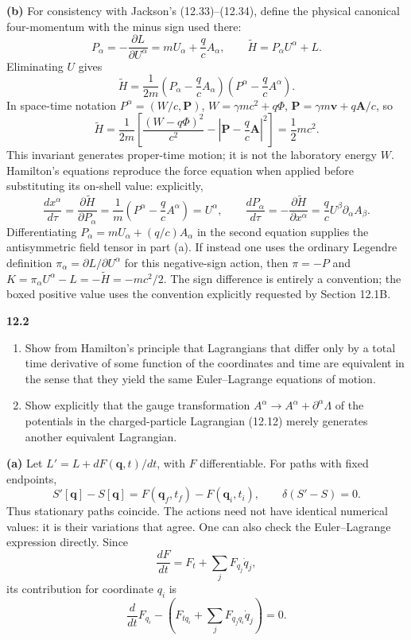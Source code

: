 \medskip\noindent\textbf{(b)} For consistency with Jackson's (12.33)--(12.34), define the physical
canonical four-momentum with the minus sign used there:
\[
P_\alpha=-\frac{\partial L}{\partial U^\alpha}
=mU_\alpha+\frac qc A_\alpha,
\qquad \widetilde H=P_\alpha U^\alpha+L.
\]
Eliminating $U$ gives
\[
\boxed{\widetilde H=\frac1{2m}
 \left(P_\alpha-\frac qc A_\alpha\right)
 \left(P^\alpha-\frac qc A^\alpha\right).}
\]
In space-time notation $P^\alpha=(W/c,\mathbf P)$,
$W=\gamma mc^2+q\Phi$, $\mathbf P=\gamma m\mathbf v+q\mathbf A/c$,
so
\[
\boxed{\widetilde H=\frac1{2m}
 \left[\frac{(W-q\Phi)^2}{c^2}
 -\left|\mathbf P-\frac qc\mathbf A\right|^2\right]
 =\frac12mc^2.}
\]
This invariant generates proper-time motion; it is not the laboratory
energy $W$.  Hamilton's equations reproduce the force equation when
applied before substituting its on-shell value: explicitly,
\[
\frac{dx^\alpha}{d\tau}=\frac{\partial\widetilde H}{\partial P_\alpha}
=\frac1m\left(P^\alpha-\frac qc A^\alpha\right)=U^\alpha,
\qquad
\frac{dP_\alpha}{d\tau}
=-\frac{\partial\widetilde H}{\partial x^\alpha}
=\frac qc U^\beta\partial_\alpha A_\beta.
\]
Differentiating $P_\alpha=mU_\alpha+(q/c)A_\alpha$ in the
second equation supplies the antisymmetric field tensor in part (a).
If instead one uses
the ordinary Legendre definition $\pi_\alpha=\partial L/\partial U^\alpha$
for this negative-sign action, then $\pi=-P$ and
$K=\pi_\alpha U^\alpha-L=-\widetilde H=-mc^2/2$.
The sign difference is entirely a convention; the boxed positive
value uses the convention explicitly requested by Section 12.1B.

\par\bigskip
\noindent\textbf{12.2}\quad\begin{enumerate}
\item[(a)] Show from Hamilton's principle that Lagrangians that differ only by a total time derivative of some function of the coordinates and time are equivalent in the sense that they yield the same Euler--Lagrange equations of motion.
\item[(b)] Show explicitly that the gauge transformation $A^{\alpha}\to A^{\alpha}+\partial^{\alpha}\Lambda$ of the potentials in the charged-particle Lagrangian (12.12) merely generates another equivalent Lagrangian.
\end{enumerate}
\solution

\medskip\noindent\textbf{(a)} Let $L'=L+dF(\mathbf q,t)/dt$, with $F$ differentiable.  For
paths with fixed endpoints,
\[
S'[\mathbf q]-S[\mathbf q]=F(\mathbf q_f,t_f)-F(\mathbf q_i,t_i),
\qquad \delta(S'-S)=0.
\]
Thus stationary paths coincide.  The actions need not have identical
numerical values: it is their variations that agree.
One can also check the Euler--Lagrange expression directly.  Since
\[
\frac{dF}{dt}=F_t+\sum_jF_{q_j}\dot q_j,
\]
its contribution for coordinate $q_i$ is
\[
\frac d{dt}F_{q_i}
-\left(F_{tq_i}+\sum_jF_{q_jq_i}\dot q_j\right)=0.
\]

